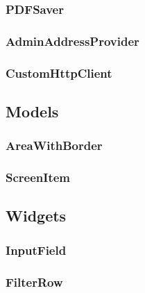 \subsubsection{PDFSaver}

\subsubsection{AdminAddressProvider}

\subsubsection{CustomHttpClient}

\subsection{Models}

\subsubsection{AreaWithBorder}

\subsubsection{ScreenItem}

\subsection{Widgets}

\subsubsection{InputField}
\label{fig:InputField} 

\subsubsection{FilterRow}
\label{fig:FilterRow}